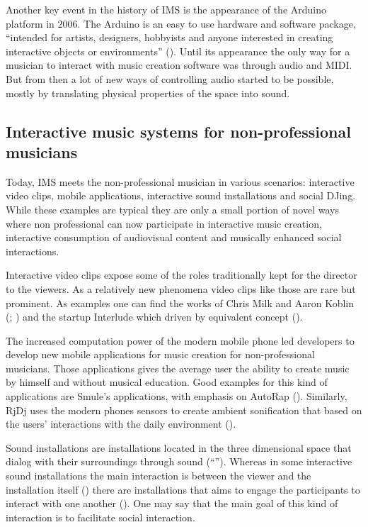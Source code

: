 Another key event in the history of IMS is the appearance of the Arduino platform in 2006.
The Arduino is an easy to use hardware and software package, ``intended for artists, designers, hobbyists and anyone interested in creating interactive objects or environments'' (\cite{web:arduino}).
Until its appearance the only way for a musician to interact with music creation software was through audio and MIDI.
But from then a lot of new ways of controlling audio started to be possible, mostly by translating physical properties of the space into sound.

\subsection{Interactive music systems for non-professional musicians}

Today, IMS meets the non-professional musician in various scenarios: interactive video clips, mobile applications, interactive sound installations and social DJing.
While these examples are typical they are only a small portion of novel ways where non professional can now participate in interactive music creation, interactive consumption of audiovisual content and musically enhanced social interactions.

Interactive video clips expose some of the roles traditionally kept for the director to the viewers.
As a relatively new phenomena video clips like those are rare but prominent.
As examples one can find the works of Chris Milk and Aaron Koblin (\cite{web:milk1}; \cite{web:milk2}) and the startup Interlude which driven by equivalent concept (\cite{web:interlude}).

The increased computation power of the modern mobile phone led developers to develop new mobile applications for music creation for non-professional musicians.
Those applications gives the average user the ability to create music by himself and without musical education.
Good examples for this kind of applications are Smule's applications, with emphasis on AutoRap (\cite{web:autorap}).
Similarly, RjDj uses the modern phones sensors to create ambient sonification that based on the users' interactions with the daily environment (\cite{web:rjdj})\label{rjdj}.

Sound installations are installations located in the three dimensional space that dialog with their surroundings through sound (``'').
Whereas in some interactive sound installations the main interaction is between the viewer and the installation itself (\cite{web:visnjic}) there are installations that aims to engage the participants to interact with one another (\cite{eng03}).
One may say that the main goal of this kind of interaction is to facilitate social interaction.

